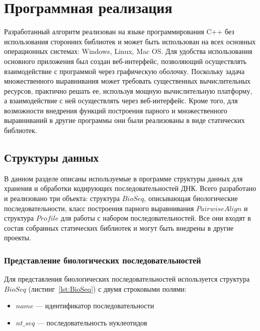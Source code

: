 \newpage

\section[Программная реализация]{\large \centering Программная реализация}
\hspace{\parindent} Разработанный алгоритм реализован на языке программирования C++ без использования сторонних библиотек и может быть использован на всех основных операционных системах: Windows, Linux, Mac OS. Для удобства использования основного приложения был создан веб-интерфейс, позволяющий осуществлять взаимодействие с программой через графическую оболочку. Поскольку задача множественного выравнивания может требовать существенных вычислительных ресурсов, практично решать ее, используя мощную вычислительную платформу, а взаимодействие с ней осуществлять через веб-интерфейс. Кроме того, для возможности внедрения функций построения парного и множественного выравниваний в другие программы они были реализованы в виде статических библиотек.

\subsection[Структуры данных]{\large Структуры данных}
\hspace{\parindent} В данном разделе описаны используемые в программе структуры данных для хранения и обработки кодирующих последовательностей ДНК. Всего разработано и реализовано три объекта: структура $BioSeq$, описывающая биологические последовательности, класс построения парного выравнивания $PairwiseAlign$ и структура $Profile$ для работы с набором последовательностей. Все они входят в состав собранных статических библиотек и могут быть внедрены в другие проекты.

\subsubsection[Представление биологических последовательностей]{\large Представление биологических последовательностей}
\hspace{\parindent} Для представления биологических последовательностей используется структура $BioSeq$ (листинг~\ref{lst:BioSeq}) с двумя строковыми полями:
\begin{itemize}
	\item $name$ --- идентификатор последовательности
	\item $nt\_seq$ --- последовательность нуклеотидов
\end{itemize}


